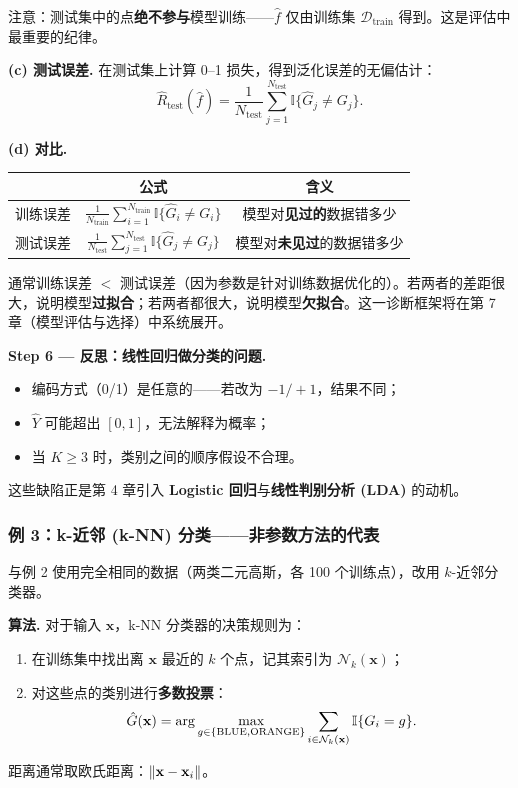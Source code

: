 注意：测试集中的点\textbf{绝不参与}模型训练——$\hat{f}$ 仅由训练集 $\mathcal{D}_{\mathrm{train}}$ 得到。这是评估中最重要的纪律。

\textbf{(c) 测试误差.}
在测试集上计算 0--1 损失，得到泛化误差的无偏估计：
\begin{equation}\label{eq:test_err}
    \widehat{R}_{\mathrm{test}}(\hat{f}) = \frac{1}{N_{\mathrm{test}}}\sum_{j=1}^{N_{\mathrm{test}}} \mathbb{I}\{ \hat{G}_j \neq G_j \}.
\end{equation}

\textbf{(d) 对比.}
\begin{center}
\renewcommand{\arraystretch}{1.3}
\begin{tabular}{c|c|c}
\toprule
& \textbf{公式} & \textbf{含义} \\
\midrule
训练误差 & $\frac{1}{N_{\mathrm{train}}}\sum_{i=1}^{N_{\mathrm{train}}} \mathbb{I}\{\hat{G}_i \neq G_i\}$ & 模型对\textbf{见过的}数据错多少 \\
测试误差 & $\frac{1}{N_{\mathrm{test}}}\sum_{j=1}^{N_{\mathrm{test}}} \mathbb{I}\{\hat{G}_j \neq G_j\}$ & 模型对\textbf{未见过}的数据错多少 \\
\bottomrule
\end{tabular}
\end{center}

通常训练误差 $<$ 测试误差（因为参数是针对训练数据优化的）。若两者的差距很大，说明模型\textbf{过拟合}；若两者都很大，说明模型\textbf{欠拟合}。这一诊断框架将在第 7 章（模型评估与选择）中系统展开。

\textbf{Step 6 --- 反思：线性回归做分类的问题.}
\begin{itemize}
    \item 编码方式（0/1）是任意的——若改为 $-1/+1$，结果不同；
    \item $\hat{Y}$ 可能超出 $[0, 1]$，无法解释为概率；
    \item 当 $K \ge 3$ 时，类别之间的顺序假设不合理。
\end{itemize}
这些缺陷正是第 4 章引入 \textbf{Logistic 回归}与\textbf{线性判别分析 (LDA)} 的动机。

\subsubsection{例 3：k-近邻 (k-NN) 分类——非参数方法的代表}

与例 2 使用完全相同的数据（两类二元高斯，各 100 个训练点），改用 $k$-近邻分类器。

\textbf{算法.}
对于输入 $\mathbf{x}$，k-NN 分类器的决策规则为：
\begin{enumerate}[label=(\roman*)]
    \item 在训练集中找出离 $\mathbf{x}$ 最近的 $k$ 个点，记其索引为 $\mathcal{N}_k(\mathbf{x})$；
    \item 对这些点的类别进行\textbf{多数投票}：
    \begin{equation}\label{eq:knn_vote}
        \hat{G}(\mathbf{x}) = \arg\max_{g \in \{\text{BLUE}, \text{ORANGE}\}}
        \sum_{i \in \mathcal{N}_k(\mathbf{x})} \mathbb{I}\{G_i = g\}.
    \end{equation}
\end{enumerate}
距离通常取欧氏距离：$\left\lVert\mathbf{x} - \mathbf{x}_i\right\rVert$。

